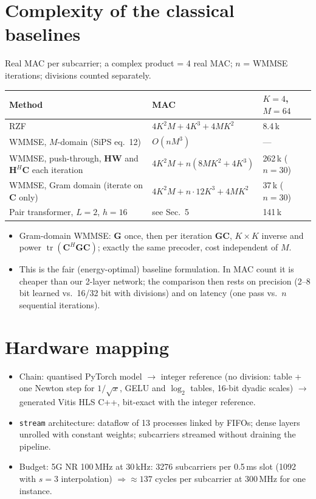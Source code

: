 \documentclass[10pt,a4paper]{article}
\newcommand{\Hm}{\mathbf{H}}
\newcommand{\Gm}{\mathbf{G}}
\newcommand{\Wm}{\mathbf{W}}
\newcommand{\Cm}{\mathbf{C}}
\newcommand{\tr}{\operatorname{tr}}
\begin{document}
\section{Complexity of the classical baselines}
Real MAC per subcarrier; a complex product = 4 real MAC; $n$ = WMMSE iterations; divisions counted separately.
\begin{center}
\begin{tabular}{lll}
\toprule
Method & MAC & $K=4$, $M=64$ \\
\midrule
RZF & $4K^2M + 4K^3 + 4MK^2$ & 8.4\,k \\
WMMSE, $M$-domain (SiPS eq.~12) & $O(nM^3)$ & --- \\
WMMSE, push-through, $\Hm\Wm$ and $\Hm^H\Cm$ each iteration & $4K^2M + n(8MK^2 + 4K^3)$ & 262\,k ($n=30$) \\
WMMSE, Gram domain (iterate on $\Cm$ only) & $4K^2M + n\cdot 12K^3 + 4MK^2$ & 37\,k ($n=30$) \\
Pair transformer, $L=2$, $h=16$ & see Sec.~5 & 141\,k \\
\bottomrule
\end{tabular}
\end{center}
\begin{itemize}
  \item Gram-domain WMMSE: $\Gm$ once, then per iteration $\Gm\Cm$, $K\times K$ inverse and power $\tr(\Cm^H\Gm\Cm)$; exactly the same precoder, cost independent of $M$.
  \item This is the fair (energy-optimal) baseline formulation. In MAC count it is cheaper than our 2-layer network;
        the comparison then rests on precision (2--8 bit learned vs.\ 16/32 bit with divisions) and on latency (one pass vs.\ $n$ sequential iterations).
\end{itemize}

\section{Hardware mapping}
\begin{itemize}
  \item Chain: quantised PyTorch model $\to$ integer reference (no division: table + one Newton step for $1/\sqrt{x}$, GELU and $\log_2$ tables,
        16-bit dyadic scales) $\to$ generated Vitis HLS C++, bit-exact with the integer reference.
  \item \texttt{stream} architecture: dataflow of 13 processes linked by FIFOs; dense layers unrolled with constant weights;
        subcarriers streamed without draining the pipeline.
  \item Budget: 5G NR 100\,MHz at 30\,kHz: 3276 subcarriers per 0.5\,ms slot (1092 with $s=3$ interpolation)
        $\Rightarrow\approx 137$ cycles per subcarrier at 300\,MHz for one instance.
\end{itemize}
\end{document}
